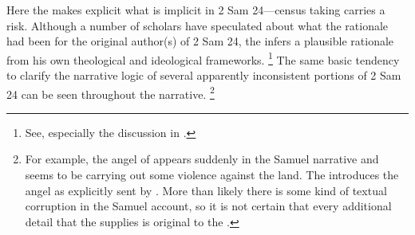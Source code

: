 \noindent
Here the \chronicler makes explicit what is implicit in 2 Sam 24---census taking carries a risk. Although a number of scholars have speculated about what the rationale had been for the original author(s) of 2 Sam 24, the \chronicler infers a plausible rationale from his own theological and ideological frameworks.%
    \footnote{See, especially the discussion in \cite[512--514]{mccarter1984}.}
The same basic tendency to clarify the narrative logic of several apparently inconsistent portions of 2 Sam 24 can be seen throughout the narrative.%
    \footnote{For example, the angel of \yahweh appears suddenly in the Samuel narrative and seems to be carrying out some violence against the land. The \chronicler introduces the angel as explicitly sent by \yahweh. More than likely there is some kind of textual corruption in the Samuel account, so it is not certain that every additional detail that the \chronicler supplies is original to the \chronicler.}

